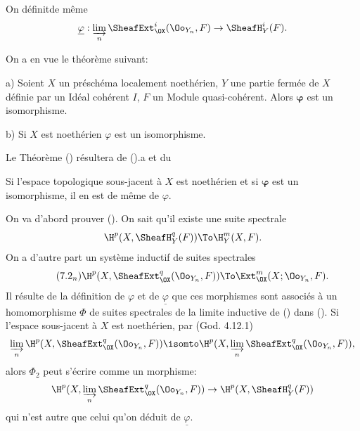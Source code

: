 \enlargethispage{\baselineskip}%
On d\'efinit\pageoriginale de m\^eme
$$
\underline{\varphi}: \varinjlim_{n} \SheafExt_{\OX}^i(\Oo_{Y_n}, F) \to {\SheafH}_Y^i(F).
$$

On a en vue le th\'eor\`eme suivant:

\begin{suptheoreme} \label{II.6} \textup{a)}
Soient $X$ un pr\'esch\'ema localement noeth\'erien, $Y$ une partie ferm\'ee de $X$ d\'efinie par un Id\'eal coh\'erent $I$, $F$ un Module quasi-coh\'erent. Alors $\boldsymbol{\varphi}$ est un isomorphisme.

\textup{b)} Si $X$ est noeth\'erien $\varphi$ est un isomorphisme.
\end{suptheoreme}

Le Th\'eor\`eme () r\'esultera de ().a et du

\begin{suplemme} \label{II.7} Si l'espace topologique sous-jacent \`a $X$ est noeth\'erien et si $\boldsymbol{\varphi}$ est un isomorphisme, il en est de m\^eme de $\varphi$.
\end{suplemme}

On va d'abord prouver (). On sait qu'il existe une suite spectrale
\begin{equation} \label{eq:II.7.1}
\H^p(X, {\SheafH}_Y^q(F)) \To \H_Y^{m}(X, F).
\end{equation}
On a d'autre part un syst\`eme inductif de suites spectrales
\begin{equation*} \label{eq:II.7.2n} \tag{7.2$_n$}\stepcounter{equation}
\H^p(X, {\SheafExt}_{\OX}^q(\Oo_{Y_n}, F)) \To \Ext_{\OX}^{m}(X;\Oo_{Y_n}, F).
\end{equation*}
Il r\'esulte de la d\'efinition de $\varphi$ et de $\underline{\varphi}$ que ces morphismes sont associ\'es \`a un homomorphisme $\Phi$ de suites spectrales de la limite inductive de () dans (). Si l'espace sous-jacent \`a $X$ est noeth\'erien, par (God. 4.12.1)
\begin{equation*}
\varinjlim_{n} \H^p(X, {\SheafExt}_{\OX}^q(\Oo_{Y_n}, F))\isomto \H^p(X, \varinjlim_{n} {\SheafExt}_{\OX}^q(\Oo_{Y_n}, F)),
\end{equation*}
alors $\Phi_2$ peut s'\'ecrire comme un morphisme:
\begin{equation*} \H^p(X, \varinjlim_{n} {\SheafExt}_{\OX}^q(\Oo_{Y_n}, F)) \to \H^p(X, {\SheafH}_Y^q(F))
\end{equation*}
qui n'est autre que celui qu'on d\'eduit de $\underline{\varphi}$.

